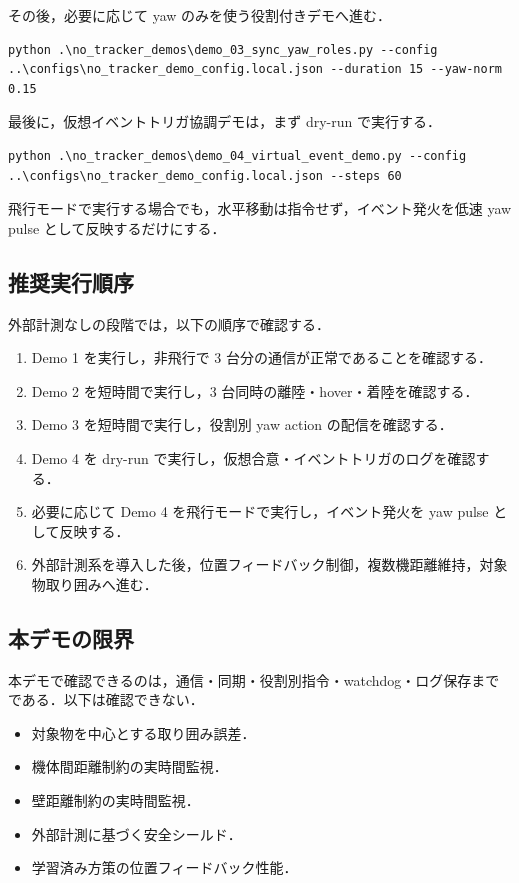 その後，必要に応じて yaw のみを使う役割付きデモへ進む．

\begin{lstlisting}
python .\no_tracker_demos\demo_03_sync_yaw_roles.py --config ..\configs\no_tracker_demo_config.local.json --duration 15 --yaw-norm 0.15
\end{lstlisting}

最後に，仮想イベントトリガ協調デモは，まず dry-run で実行する．

\begin{lstlisting}
python .\no_tracker_demos\demo_04_virtual_event_demo.py --config ..\configs\no_tracker_demo_config.local.json --steps 60
\end{lstlisting}

飛行モードで実行する場合でも，水平移動は指令せず，イベント発火を低速 yaw pulse として反映するだけにする．

\subsection{推奨実行順序}

外部計測なしの段階では，以下の順序で確認する．

\begin{enumerate}
  \item Demo 1 を実行し，非飛行で 3 台分の通信が正常であることを確認する．
  \item Demo 2 を短時間で実行し，3 台同時の離陸・hover・着陸を確認する．
  \item Demo 3 を短時間で実行し，役割別 yaw action の配信を確認する．
  \item Demo 4 を dry-run で実行し，仮想合意・イベントトリガのログを確認する．
  \item 必要に応じて Demo 4 を飛行モードで実行し，イベント発火を yaw pulse として反映する．
  \item 外部計測系を導入した後，位置フィードバック制御，複数機距離維持，対象物取り囲みへ進む．
\end{enumerate}

\subsection{本デモの限界}

本デモで確認できるのは，通信・同期・役割別指令・watchdog・ログ保存までである．以下は確認できない．

\begin{itemize}
  \item 対象物を中心とする取り囲み誤差．
  \item 機体間距離制約の実時間監視．
  \item 壁距離制約の実時間監視．
  \item 外部計測に基づく安全シールド．
  \item 学習済み方策の位置フィードバック性能．
\end{itemize}

